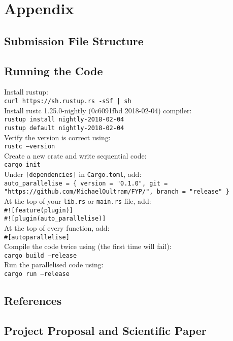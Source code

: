 \section{Appendix}
\subsection{Submission File Structure}

\subsection{Running the Code}
Install rustup: \\
\texttt{curl https://sh.rustup.rs -sSf | sh} \\

Install rustc 1.25.0-nightly (0c6091fbd 2018-02-04) compiler: \\
\texttt{rustup install nightly-2018-02-04} \\
\texttt{rustup default nightly-2018-02-04} \\

Verify the version is correct using: \\
\texttt{rustc --version} \\

Create a new crate and write sequential code: \\
\texttt{cargo init} \\

Under \texttt{[dependencies]} in \texttt{Cargo.toml}, add: \\
\texttt{auto\_parallelise = \{ version = "0.1.0", git = "https://github.com/MichaelOultram/FYP/", branch = "release" \}} \\

At the top of your \texttt{lib.rs} or \texttt{main.rs} file, add: \\
\texttt{\#![feature(plugin)]} \\
\texttt{\#![plugin(auto\_parallelise)]} \\

At the top of every function, add: \\
\texttt{\#[autoparallelise]} \\

Compile the code twice using (the first time will fail): \\
\texttt{cargo build --release} \\

Run the parallelised code using: \\
\texttt{cargo run --release}

\subsection{References}
\printbibliography[heading=none]

\subsection{Project Proposal and Scientific Paper}


